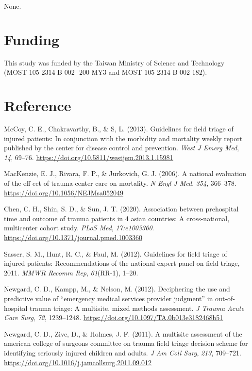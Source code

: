 \documentclass[
  20pt
]{article}
\newlength{\cslhangindent}
\newenvironment{CSLReferences}[2] %
 {%
  \setlength{\parindent}{0pt}
  \ifodd #1 \everypar{\setlength{\hangindent}{\cslhangindent}}\ignorespaces\fi
  \ifnum #2 > 0
  \setlength{\parskip}{#2\baselineskip}
  \fi
 }%
 {}
\begin{document}
\begin{multicols}{2}
None.

\hypertarget{funding}{%
\section{Funding}\label{funding}}

This study was funded by the Taiwan Ministry of Science and Technology
(MOST 105-2314-B-002- 200-MY3 and MOST 105-2314-B-002-182).

\hypertarget{reference}{%
\section*{Reference}\label{reference}}

\hypertarget{refs}{}
\begin{CSLReferences}{1}{0}
\leavevmode{}%
McCoy, C. E., Chakravarthy, B., \& S, L. (2013). Guidelines for field
triage of injured patients: In conjunction with the morbidity and
mortality weekly report published by the center for disease control and
prevention. \emph{West J Emerg Med}, \emph{14}, 69--76.
\url{https://doi.org/10.5811/westjem.2013.1.15981}

\leavevmode{}%
MacKenzie, E. J., Rivara, F. P., \& Jurkovich, G. J. (2006). A national
evaluation of the eff ect of trauma-center care on mortality. \emph{N
Engl J Med}, \emph{354}, 366--378.
\url{https://doi.org/10.1056/NEJMsa052049}

\leavevmode{}%
Chen, C. H., Shin, S. D., \& Sun, J. T. (2020). Association between
prehospital time and outcome of trauma patients in 4 asian countries: A
cross-national, multicenter cohort study. \emph{PLoS Med},
\emph{17:e1003360}. \url{https://doi.org/10.1371/journal.pmed.1003360}

\leavevmode{}%
Sasser, S. M., Hunt, R. C., \& Faul, M. (2012). Guidelines for field
triage of injured patients: Recommendations of the national expert panel
on field triage, 2011. \emph{MMWR Recomm Rep}, \emph{61}(RR-1), 1--20.

\leavevmode{}%
Newgard, C. D., Kampp, M., \& Nelson, M. (2012). Deciphering the use and
predictive value of {``emergency medical services provider judgment''}
in out-of-hospital trauma triage: A multisite, mixed methods assessment.
\emph{J Trauma Acute Care Surg}, \emph{72}, 1239--1248.
\url{https://doi.org/10.1097/TA.0b013e3182468b51}

\leavevmode{}%
Newgard, C. D., Zive, D., \& Holmes, J. F. (2011). A multisite
assessment of the american college of surgeons committee on trauma field
triage decision scheme for identifying seriously injured children and
adults. \emph{J Am Coll Surg}, \emph{213}, 709--721.
\url{https://doi.org/10.1016/j.jamcollsurg.2011.09.012}

\end{CSLReferences}
\end{multicols}


\end{document}
